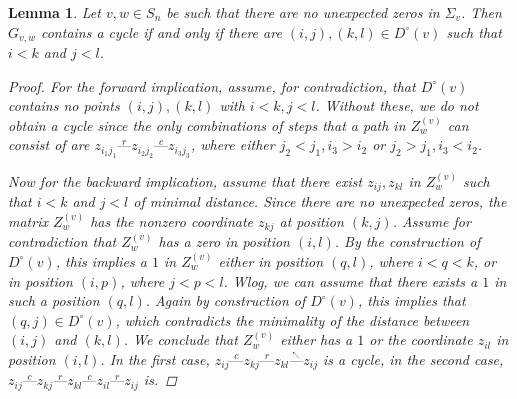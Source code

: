 \documentclass[11pt]{amsart}
\newtheorem{lemma}[theorem]{Lemma}
\theoremstyle{definition}
\theoremstyle{definition}
\theoremstyle{definition}
\theoremstyle{definition}
\newcommand{\Gvwt}{G_{v,w}}
\newcommand{\Dc}{D^{\circ}}
\newcommand{\dash}{\text{---}}
\newcommand{\Zg}{Z^{(v)}_w}
\begin{document}
\begin{lemma}\label{contains cycle}
Let $v,w \in S_n$ be such that there are no unexpected zeros in  $\Sigma_v$. Then $\Gvwt$ contains a cycle if and only if there are $(i,j),(k,l) \in D^{\circ}(v)$ such that $i<k$ and $j<l$.  

\begin{proof}

    For the forward implication, assume, for contradiction, that $\Dc(v)$ contains no points $(i,j),(k,l)$ with $i<k,j<l$. Without these, we do not obtain a cycle since the only combinations of steps that a path in $\Zg$ can consist of are $z_{i_1 j_1} \stackrel{r}{\dash} z_{i_2 j_2} \stackrel{c}{\dash}  z_{i_3 j_3}$, where either $j_2 < j_1,i_3 > i_2$ or $j_2>j_1, i_3<i_2$.


    Now for the backward implication, assume that there exist $z_{ij},z_{kl} $ in $\Zg$ such that $i<k$ and $j<l$ of minimal distance. Since there are no unexpected zeros, the matrix $\Zg$ has the nonzero coordinate $z_{kj}$ at position $(k,j)$. Assume for contradiction that $\Zg$ has a zero in position $(i,l)$. By the construction of $\Dc(v)$, this implies a $1$ in $\Zg$ either in position $(q,l)$, where $i<q<k$, or in position $(i,p)$, where $j<p<l$. Wlog, we can assume that there exists a $1$ in such a position $(q,l)$. Again by construction of $\Dc(v)$, this implies that $(q,j)\in \Dc(v)$, which contradicts the minimality of the distance between $(i,j)$ and $(k,l)$. We conclude that $\Zg$ either has a $1$ or the coordinate $z_{il}$ in position $(i,l)$. In the first case, 
    $z_{ij} \stackrel{c}{\dash} z_{kj} \stackrel{r}{\dash} z_{kl}\stackrel{_{\nwarrow}}{\dash} z_{ij}$ is a cycle, in the second case, 
    $z_{ij} \stackrel{c}{\dash} z_{kj} \stackrel{r}{\dash} z_{kl}\stackrel{c}{\dash} z_{il} \stackrel{r}{\dash} z_{ij}$ is.   
\end{proof}
\end{lemma}
\end{document}

